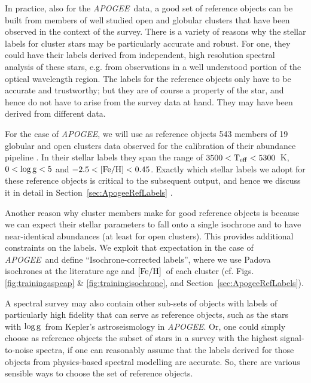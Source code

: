 \documentclass[12pt, preprint]{aastex}
\newcommand{\sectionname}{Section}
\newcommand{\apogee}{\textsl{APOGEE}}
\newcommand{\teff}{\mbox{$\rm T_{eff}$}}
\newcommand{\feh}{\mbox{$\rm [Fe/H]$}}
\newcommand{\logg}{\mbox{$\rm \log g$}}
\begin{document}
In practice, also for the \apogee\ data,
a good set of reference objects can be built from 
members of well studied open and globular clusters that have been observed in the context of the survey.
There is a variety of reasons why the stellar labels for cluster stars may be particularly accurate and robust.
For one, they could have their labels derived from independent, high resolution spectral analysis of these
stars, e.g. from observations in a well understood portion of the optical wavelength region. The
labels for the reference objects only have to be accurate and trustworthy; but they are of course a property of the
star, and hence do not have to arise from the survey data at hand. They may have been derived from different data.

For the case of \apogee, we will use as reference objects 543 members of 19 globular and open clusters data observed for the
calibration of their abundance pipeline \citep{Meszaros2013}. In their stellar labels they span the range of $3500<\teff<5300$~K, $0<\logg<5$ and $-2.5<\feh<0.45$. 
Exactly which stellar labels we adopt for these reference objects is critical to the subsequent output, and hence 
we discuss it in detail in \sectionname~\ref{sec:ApogeeRefLabels} .

Another reason why cluster members make for good reference objects is because we can expect their stellar parameters to fall onto a single isochrone and to have near-identical abundances (at least for open clusters). This provides additional constraints on the labels.
We exploit that expectation in the case of \apogee\ and define ``Isochrone-corrected labels'', where we use Padova isochrones at the literature age and \feh\ of each cluster (cf. Figs. \ref{fig:trainingaspcap} \& \ref{fig:trainingisochrone}, and \sectionname~\ref{sec:ApogeeRefLabels}).

A spectral survey may also contain other sub-sets of objects with labels of particularly high fidelity that can serve as reference objects, such as the stars with \logg\ from Kepler's astroseismology in \apogee . Or, one could simply choose as reference objects the subset of stars in a survey with the highest signal-to-noise spectra, if one can reasonably assume that the labels derived for those objects from physics-based spectral modelling are accurate. So, there are various sensible ways to choose the set of reference objects.
\end{document}
